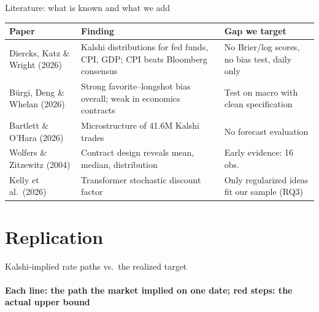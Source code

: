 \documentclass[aspectratio=169, 11pt, t]{beamer}
\begin{document}
\begin{frame}{Literature: what is known and what we add}
  \centering\footnotesize
  \renewcommand{\arraystretch}{1.25}
  \begin{tabular}{>{\raggedright\arraybackslash}p{3.5cm}>{\raggedright\arraybackslash}p{5.5cm}>{\raggedright\arraybackslash}p{4.2cm}}
    \toprule
    Paper & Finding & Gap we target \\
    \midrule
    Diercks, Katz \& Wright (2026) & Kalshi distributions for fed funds, CPI, GDP; CPI beats Bloomberg consensus & No Brier/log scores, no bias test, daily only \\
    B\"urgi, Deng \& Whelan (2026) & Strong favorite--longshot bias overall; weak in economics contracts & Test on macro with clean specification \\
    Bartlett \& O'Hara (2026) & Microstructure of 41.6M Kalshi trades & No forecast evaluation \\
    Wolfers \& Zitzewitz (2004) & Contract design reveals mean, median, distribution & Early evidence: 16 obs.\ \\
    Kelly et al.\ (2026) & Transformer stochastic discount factor & Only regularized ideas fit our sample (RQ3) \\
    \bottomrule
  \end{tabular}
\end{frame}

\section{Replication}
\begin{frame}{Kalshi-implied rate paths vs.\ the realized target}
  \framesubtitle{Each line: the path the market implied on one date; red steps: the actual upper bound}
  \centering
\end{frame}
\end{document}
